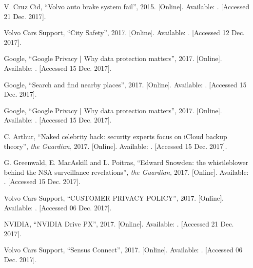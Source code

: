 \documentclass[conference]{IEEEtran}
\begin{document}
\begin{thebibliography}{00}
	V. Cruz Cid,
	``Volvo auto brake system fail'',
	2015.
	[Online]. Available:
	.
	[Accessed 21 Dec. 2017].
	
	Volvo Cars Support,
	``City Safety'',
	2017.
	[Online]. Available: .
	[Accessed 12 Dec. 2017].
	
	Google, 
	``Google Privacy | Why data protection matters'',
	2017.
	[Online]. Available:
	.
	[Accessed 15 Dec. 2017].
	
	Google,
	``Search and find nearby places'',
	2017.
	[Online]. Available: .
	[Accessed 15 Dec. 2017].
	
	Google,
	``Google Privacy | Why data protection matters'',
	2017.
	[Online]. Available:
	.
	[Accessed 15 Dec. 2017].
	
	C. Arthur,
	``Naked celebrity hack: security experts focus on iCloud backup theory'',
	\emph{the Guardian},
	2017.
	[Online]. Available: .
	[Accessed 15 Dec. 2017].
	
	G. Greenwald, E. MacAskill and L. Poitras,
	``Edward Snowden: the whistleblower behind the NSA surveillance revelations'',
	\emph{the Guardian},
	2017.
	[Online]. Available: .
	[Accessed 15 Dec. 2017].
	
	Volvo Cars Support,
	``CUSTOMER PRIVACY POLICY'',
	2017.
	[Online]. Available:
	.
	[Accessed 06 Dec. 2017].
	
	NVIDIA,
	``NVIDIA Drive PX'',
	2017.
	[Online]. Available:
	.
	[Accessed 21 Dec. 2017].
	
	Volvo Cars Support,
	``Sensus Connect'',
	2017.
	[Online]. Available: 
	.
	[Accessed 06 Dec. 2017].
	

\end{thebibliography}
\end{document}
